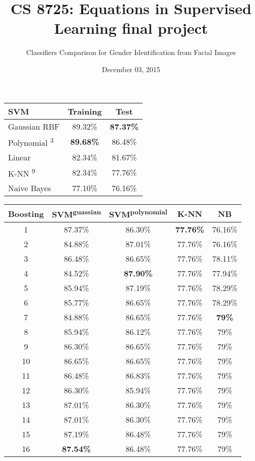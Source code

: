 \documentclass[a4paper]{article}
\begin{document}
\title{CS 8725: Equations in Supervised Learning final project}
\author{Classifiers Comparison for Gender Identification from Facial Images}
\date{December 03, 2015}
\maketitle

\begin{center}
\begin{tabular}{ | l | c | c | } \hline
  SVM & Training & Test \\ \hline
  Gaussian RBF & 89.32\% & \textbf{87.37\%} \\
  Polynomial \textsuperscript{3} & \textbf{89.68\%} & 86.48\% \\
  Linear & 82.34\% & 81.67\% \\ \hline
  K-NN \textsuperscript{9} & 82.34\% & 77.76\% \\ \hline
  Naive Bayes & 77.10\% & 76.16\% \\
  \hline
\end{tabular}
\end{center}


\begin{center}
\begin{tabular}{ | c | c | c | c | c | } \hline
  Boosting & SVM\textsuperscript{guassian} & SVM\textsuperscript{polynomial} & K-NN & NB \\ \hline
  1 & 87.37\% & 86.30\% & \textbf{77.76\%} & 76.16\% \\
  2 & 84.88\% & 87.01\% & 77.76\% & 76.16\% \\
  3 & 86.48\% & 86.65\% & 77.76\% & 78.11\% \\
  4 & 84.52\% & \textbf{87.90\%} & 77.76\% & 77.94\% \\
  5 & 85.94\% & 87.19\% & 77.76\% & 78.29\% \\
  6 & 85.77\% & 86.65\% & 77.76\% & 78.29\% \\
  7 & 84.88\% & 86.65\% & 77.76\% & \textbf{79\%} \\
  8 & 85.94\% & 86.12\% & 77.76\% & 79\% \\
  9 & 86.30\% & 86.65\% & 77.76\% & 79\% \\
  10 & 86.65\% & 86.65\% & 77.76\% & 79\% \\
  11 & 86.48\% & 86.83\% & 77.76\% & 79\% \\
  12 & 86.30\% & 85.94\% & 77.76\% & 79\% \\
  13 & 87.01\% & 86.30\% & 77.76\% & 79\% \\
  14 & 87.01\% & 86.30\% & 77.76\% & 79\% \\
  15 & 87.19\% & 86.48\% & 77.76\% & 79\% \\
  16 & \textbf{87.54\%} & 86.48\% & 77.76\% & 79\% \\ \hline
\end{tabular}
\end{center}
\end{document}
